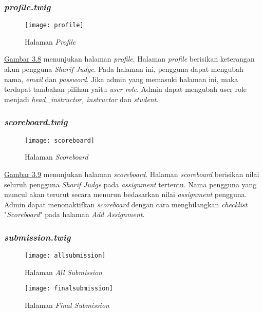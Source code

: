\subsubsection{\textit{profile.twig}}
\begin{figure}[H]
	\centering  
	\texttt{[image: profile]}  
	\caption[Halaman \textit{Profile}]{Halaman \textit{Profile}} 
	\label{fig:profile} 
\end{figure} 
\hyperref[fig:profile]{Gambar 3.8} menunjukan halaman \textit{profile}. Halaman \textit{profile} berisikan keterangan akun pengguna \textit{Sharif Judge}. Pada halaman ini, pengguna dapat mengubah nama, \textit{email} dan \textit{password}. Jika admin yang memasuki halaman ini, maka terdapat tambahan pilihan yaitu \textit{user role}. Admin dapat mengubah user role menjadi \textit{head\_instructor, instructor} dan \textit{student}.

\subsubsection{\textit{scoreboard.twig}}
\begin{figure}[H]
	\centering  
	\texttt{[image: scoreboard]}  
	\caption[Halaman \textit{Scoreboard}]{Halaman \textit{Scoreboard}} 
	\label{fig:scoreboard} 
\end{figure} 
\hyperref[fig:scoreboard]{Gambar 3.9} menunjukan halaman \textit{scoreboard}. Halaman \textit{scoreboard} berisikan nilai seluruh pengguna \textit{Sharif Judge} pada \textit{assignment} tertentu. Nama pengguna yang muncul akan terurut secara menurun bedasarkan nilai \textit{assignment} pengguna. Admin dapat menonaktifkan \textit{scoreboard} dengan cara menghilangkan \textit{checklist} "\textit{Scoreboard}" pada halaman \textit{Add Assignment}.

\subsubsection{\textit{submission.twig}}
\begin{figure}[H]
	\centering  
	\texttt{[image: allsubmission]}  
	\caption[Halaman \textit{All Submission}]{Halaman \textit{All Submission}} 
	\label{fig:allsubmission} 
\end{figure} 

\begin{figure}[H]
	\centering  
	\texttt{[image: finalsubmission]}  
	\caption[Halaman \textit{Final Submission}]{Halaman \textit{Final Submission}} 
	\label{fig:finalsubmission} 
\end{figure} 

